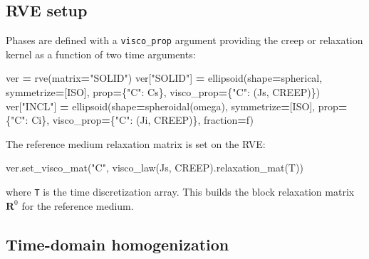 \documentclass[
  a4paper,
  numbers=noendperiod,
  DIV=12]{scrreprt}
\newenvironment{Shaded}{\begin{snugshade}}{\end{snugshade}}
\newcommand{\NormalTok}[1]{#1}
\newcommand{\OperatorTok}[1]{\textcolor[rgb]{0.81,0.36,0.00}{\textbf{#1}}}
\newcommand{\StringTok}[1]{\textcolor[rgb]{0.31,0.60,0.02}{#1}}
\begin{document}
\subsection{RVE setup}\label{rve-setup}

Phases are defined with a \texttt{visco\_prop} argument providing the
creep or relaxation kernel as a function of two time arguments:

\begin{Shaded}
\begin{Highlighting}[]
\NormalTok{ver }\OperatorTok{=}\NormalTok{ rve(matrix}\OperatorTok{=}\StringTok{"SOLID"}\NormalTok{)}
\NormalTok{ver[}\StringTok{"SOLID"}\NormalTok{] }\OperatorTok{=}\NormalTok{ ellipsoid(shape}\OperatorTok{=}\NormalTok{spherical, symmetrize}\OperatorTok{=}\NormalTok{[ISO],}
\NormalTok{                          prop}\OperatorTok{=}\NormalTok{\{}\StringTok{"C"}\NormalTok{: Cs\},}
\NormalTok{                          visco\_prop}\OperatorTok{=}\NormalTok{\{}\StringTok{"C"}\NormalTok{: (Js, CREEP)\})}
\NormalTok{ver[}\StringTok{"INCL"}\NormalTok{]  }\OperatorTok{=}\NormalTok{ ellipsoid(shape}\OperatorTok{=}\NormalTok{spheroidal(omega), symmetrize}\OperatorTok{=}\NormalTok{[ISO],}
\NormalTok{                          prop}\OperatorTok{=}\NormalTok{\{}\StringTok{"C"}\NormalTok{: Ci\},}
\NormalTok{                          visco\_prop}\OperatorTok{=}\NormalTok{\{}\StringTok{"C"}\NormalTok{: (Ji, CREEP)\},}
\NormalTok{                          fraction}\OperatorTok{=}\NormalTok{f)}
\end{Highlighting}
\end{Shaded}

The reference medium relaxation matrix is set on the RVE:

\begin{Shaded}
\begin{Highlighting}[]
\NormalTok{ver.set\_visco\_mat(}\StringTok{"C"}\NormalTok{, visco\_law(Js, CREEP).relaxation\_mat(T))}
\end{Highlighting}
\end{Shaded}

where \texttt{T} is the time discretization array. This builds the block
relaxation matrix \(\mathbf{R}^0\) for the reference medium.

\subsection{Time-domain
homogenization}\label{time-domain-homogenization}
\end{document}

